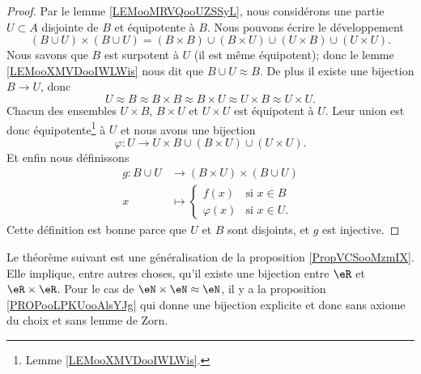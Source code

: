\begin{proof}
	Par le lemme \ref{LEMooMRVQooUZSSyL}, nous considérons une partie \( U\subset A\) disjointe de \( B\) et équipotente à \( B\). Nous pouvons écrire le développement
	\begin{equation}
		(B\cup U)\times (B\cup U)=(B\times B)\cup(B\times U)\cup (U\times B)\cup (U\times U).
	\end{equation}
	Nous savons que \( B\) est surpotent à \( U\) (il est même équipotent); donc le lemme \ref{LEMooXMVDooIWLWis} nous dit que \( B\cup U\approx B\). De plus il existe une bijection \( B\to U\), donc
	\begin{equation}
		U\approx B\approx B\times B\approx B\times U\approx U\times B\approx U\times U.
	\end{equation}
	Chacun des ensembles  \( U\times B\),  \( B\times U\) et \( U\times U\) est équipotent à \( U\). Leur union est donc équipotente\footnote{Lemme \ref{LEMooXMVDooIWLWis}.} à \( U\) et nous avons une bijection
	\begin{equation}
		\varphi\colon U\to U\times B\cup (B\times U)\cup (U\times U).
	\end{equation}
	Et enfin nous définissons
	\begin{equation}
		\begin{aligned}
			g\colon B\cup U & \to (B\times U)\times (B\cup U)         \\
			x               & \mapsto \begin{cases}
				                          f(x)       & \text{si }  x\in B \\
				                          \varphi(x) & \text{si } x\in U.
			                          \end{cases}
		\end{aligned}
	\end{equation}
	Cette définition est bonne parce que \( U\) et \( B\) sont disjoints, et \( g\) est injective.
\end{proof}

\begin{normaltext}	\label{NORMooBijectionAA}
	Le théorème suivant est une généralisation de la proposition \ref{PropVCSooMzmIX}. Elle implique, entre autres choses, qu'il existe une bijection entre \( \eR\) et \( \eR\times \eR\). Pour le cas de \( \eN\times \eN\approx \eN\), il y a la proposition \ref{PROPooLPKUooAlsYJg} qui donne une bijection explicite et donc sans axiome du choix et sans lemme de Zorn.
\end{normaltext}

